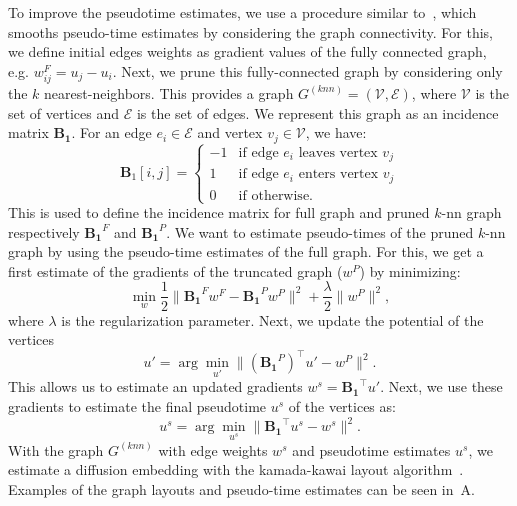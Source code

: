 To improve the pseudotime estimates, we use a procedure similar to~\cite{maehara2019ddhodge}, which smooths pseudo-time estimates by considering the graph connectivity. For this, we define initial edges weights as gradient values of the fully connected graph, e.g. $w^{F}_{ij}=u_j - u_i$. Next, we prune this fully-connected graph by considering only the $k$ nearest-neighbors. This provides a graph $G^{(knn)}=(\mathcal{V}, \mathcal{E})$, where $\mathcal{V}$ is the set of vertices and $\mathcal{E}$ is the set of edges.
We represent this graph as an incidence matrix $\mathbf{B_1}$. For an edge $e_i \in \mathcal{E}$ and vertex $v_j \in \mathcal{V}$, we have:
\begin{equation}
\label{eqn:incidencematrix1}
\mathbf{B}_1[i,j] = \begin{cases}
-1 &\text{if edge } e_i \text{ leaves  vertex }v_j \\
1 &\text{if edge } e_i \text{ enters  vertex }v_j \\
0 &\text{if otherwise}.
\end{cases}
\end{equation}
This is used to define the incidence matrix for full graph and pruned $k$-nn graph respectively $\mathbf{B_1}^F$ and $\mathbf{B_1}^P$.
\noindent We want to estimate pseudo-times of the pruned $k$-nn graph by using the pseudo-time estimates of the full graph. For this, we get a first estimate of the gradients of the truncated graph ($w^P$) by minimizing:
\begin{equation}
\label{eqn:ddhodge1}
    \min_{w}\frac{1}{2}\|\mathbf{B_1}^F w^F - \mathbf{B_1}^P w^P\|^2 + \frac{\lambda}{2}\|w^P\|^2,
\end{equation}
\noindent where $\lambda$ is the regularization parameter. Next, we update the potential of the vertices
\begin{equation}
\label{eqn:ddhodge2}
  u' = \arg\underset{u'}{\min}\|(\mathbf{B_1}^P)^\top u' - w^P\|^2.
\end{equation}
\noindent This allows us to estimate an updated gradients $w^s=\mathbf{B_1}^\top u'$. Next, we use these gradients to estimate the final pseudotime $u^s$ of the vertices as:
\begin{equation}
\label{eqn:ddhodge3}
    u^s = \arg\underset{u^s}{\min} \| \mathbf{B_1}^\top u^s - w^s\|^2.
\end{equation}
\noindent With the graph $G^{(knn)}$ with edge weights $w^s$ and pseudotime estimates $u^s$, we estimate a diffusion embedding with the kamada-kawai layout algorithm~\citep{gansner2004graph, ortmann2016sparse}. Examples of the graph layouts and pseudo-time estimates can be seen in~A.

